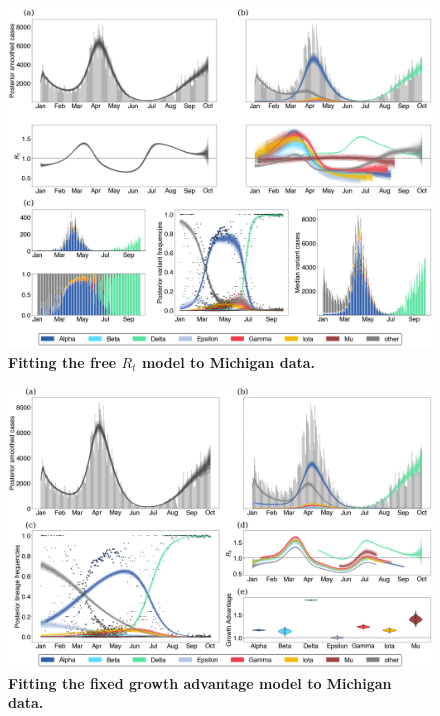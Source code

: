\documentclass[11pt,oneside,letterpaper]{article}
\begin{document}
\begin{figure}
  \centering
  \includegraphics[width=\linewidth]{figs/free_rt_Michigan.png}
  \caption{\textbf{Fitting the free $R_{t}$ model to Michigan data.}}%
  \label{fig:free_rt_Michigan}
\end{figure}

\begin{figure}
  \centering
  \includegraphics[width=\linewidth]{figs/fixed_growth_Michigan.png}
  \caption{\textbf{Fitting the fixed growth advantage model to Michigan data.}}%
  \label{fig:fixed_growth_Michigan}
\end{figure}
\end{document}
